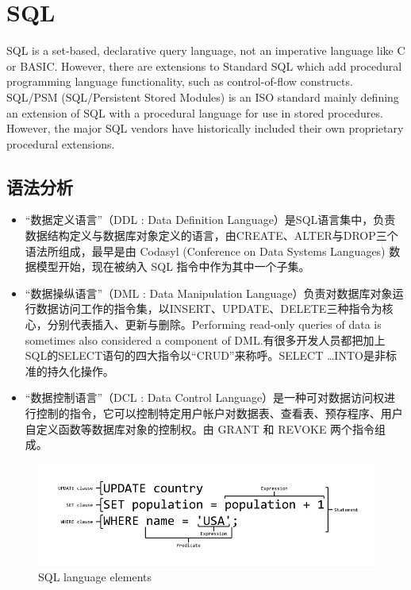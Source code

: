 \section{SQL}

SQL is a set-based, declarative query language, not an imperative language like C or BASIC. However, there are extensions to Standard SQL which add procedural programming language functionality, such as control-of-flow constructs. SQL/PSM (SQL/Persistent Stored Modules) is an ISO standard mainly defining an extension of SQL with a procedural language for use in stored procedures. However, the major SQL vendors have historically included their own proprietary procedural extensions. 

\subsection{语法分析}
\begin{itemize}
    \item 
“数据定义语言”（DDL : Data Definition Language）是SQL语言集中，负责数据结构定义与数据库对象定义的语言，由CREATE、ALTER与DROP三个语法所组成，最早是由 Codasyl (Conference on Data Systems Languages) 数据模型开始，现在被纳入 SQL 指令中作为其中一个子集。
    \item 
“数据操纵语言”（DML : Data Manipulation Language）负责对数据库对象运行数据访问工作的指令集，以INSERT、UPDATE、DELETE三种指令为核心，分别代表插入、更新与删除。Performing read-only queries of data is sometimes also considered a component of DML.有很多开发人员都把加上SQL的SELECT语句的四大指令以“CRUD”来称呼。SELECT \ldots INTO是非标准的持久化操作。
    \item 
“数据控制语言”（DCL : Data Control Language）是一种可对数据访问权进行控制的指令，它可以控制特定用户帐户对数据表、查看表、预存程序、用户自定义函数等数据库对象的控制权。由 GRANT 和 REVOKE 两个指令组成。
\end{itemize}

\begin{figure}[htpb]
    \begin{center}
        \includegraphics[keepaspectratio,width=0.5\paperwidth]{Pictures/SQL_ANATOMY_wiki.svg.png}
    \end{center}
    \caption{SQL language elements}
    \label{fig:SQL lan elem}
\end{figure}


